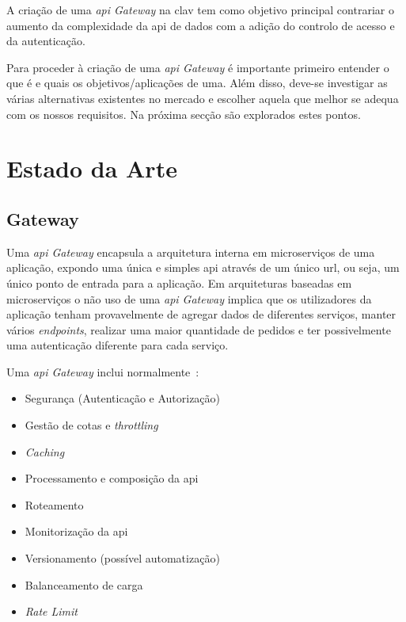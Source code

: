 A criação de uma \textit{\acrshort{api} Gateway} na \acrshort{clav} tem como objetivo principal contrariar o aumento da complexidade da \acrshort{api} de dados com a adição do controlo de acesso e da autenticação.

Para proceder à criação de uma \textit{\acrshort{api} Gateway} é importante primeiro entender o que é e quais os objetivos/aplicações de uma. Além disso, deve-se investigar as várias alternativas existentes no mercado e escolher aquela que melhor se adequa com os nossos requisitos. Na próxima secção são explorados estes pontos.

\section{Estado da Arte}

\subsection{ Gateway}\label{sec:api_gateway}

Uma \textit{\acrshort{api} Gateway} encapsula a arquitetura interna em microserviços de uma aplicação, expondo uma única e simples \acrshort{api} através de um único \acrshort{url}, ou seja, um único ponto de entrada para a aplicação. Em arquiteturas baseadas em microserviços o não uso de uma \textit{\acrshort{api} Gateway} implica que os utilizadores da aplicação tenham provavelmente de agregar dados de diferentes serviços, manter vários \textit{endpoints}, realizar uma maior quantidade de pedidos e ter possivelmente uma autenticação diferente para cada serviço.

Uma \textit{\acrshort{api} Gateway} inclui normalmente~\cite{apiGatInfo,apiGatInfo2}:
\begin{itemize}
    \item Segurança (Autenticação e Autorização)
    \item Gestão de cotas e \textit{throttling}
    \item \textit{Caching}
    \item Processamento e composição da \acrshort{api}
    \item Roteamento
    \item Monitorização da \acrshort{api}
    \item Versionamento (possível automatização)
    \item Balanceamento de carga
    \item \textit{Rate Limit}
\end{itemize}

